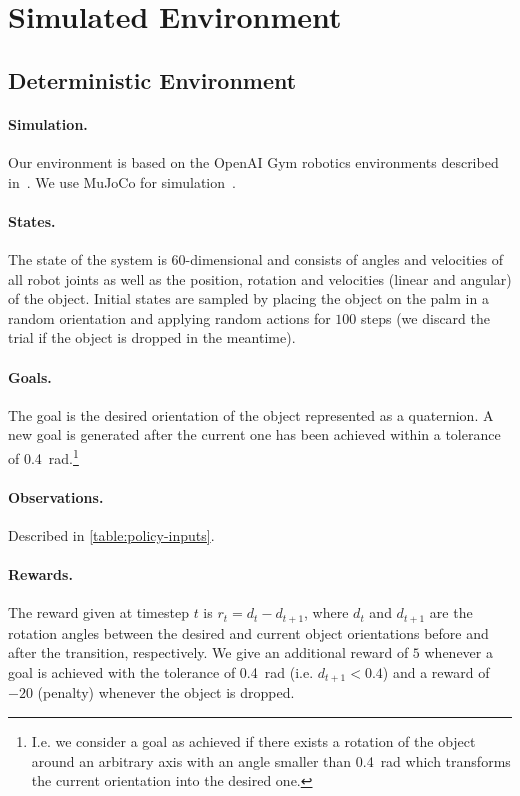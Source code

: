 \section{Simulated Environment}
\subsection{Deterministic Environment} \label{app:sim}



\paragraph{Simulation.} Our environment is based on the OpenAI Gym robotics environments described in~\citep{plappert2018multi}. We use MuJoCo for simulation~\citep{MuJoCo}.

\paragraph{States.}
The state of the system is \num{60}-dimensional and consists of angles and velocities of all robot joints as well as the position, rotation and velocities (linear and angular) of the object.
Initial states are sampled by placing the object on the palm in a random orientation
and applying random actions for $100$ steps (we discard the trial if the object is dropped in the meantime).

\paragraph{Goals.}
The goal is the desired orientation of the object represented as a quaternion.
A new goal is generated after the current one has been achieved within a tolerance of \SI{0.4}{\radian}.\footnote{I.e. we consider a goal as achieved if there exists a
rotation of the object around an arbitrary axis with an angle smaller than \SI{0.4}{\radian}
which transforms the current orientation into the desired one.}

\paragraph{Observations.}
Described in \autoref{table:policy-inputs}.



\paragraph{Rewards.} \label{sec:reward}
The reward given at timestep $t$ is $r_t=d_t-d_{t+1}$, where
$d_t$ and $d_{t+1}$ are the rotation angles between the desired 
and current object orientations before and after the transition, respectively.
We give an additional reward of $5$ whenever a goal is achieved with the tolerance of \SI{0.4}{\radian}
(i.e. $d_{t+1}<0.4$) and a reward of $-20$ (penalty) whenever the object is dropped.

